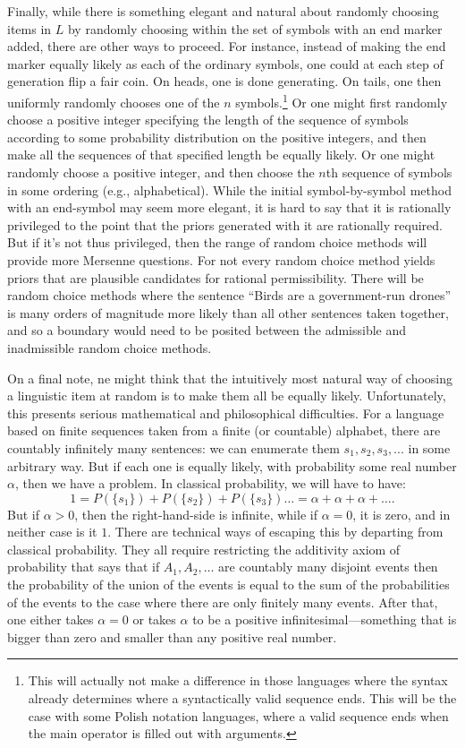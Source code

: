 Finally, while there is something elegant and natural about randomly choosing items in $L$ by randomly choosing within the
set of symbols with an end marker added, there are other ways to proceed. For instance, instead of making the end marker
equally likely as each of the ordinary symbols, one could at each step of generation flip a fair coin. On heads, one is done
generating. On tails, one then uniformly randomly chooses one of the $n$ symbols.\footnote{This will actually not make a 
difference in those languages where the syntax already determines where a syntactically valid sequence ends. This will be the
case with some Polish notation languages, where a valid sequence ends when the main operator is filled out with arguments.}
Or one might first randomly choose a positive integer specifying the length of the sequence of symbols according to some
probability distribution on the positive integers, and then make all the sequences of that specified length be equally likely. 
Or one might randomly choose a positive integer, and then choose the $n$th sequence of symbols in some ordering (e.g., alphabetical).
While the initial symbol-by-symbol method with an end-symbol may seem more elegant, it is hard to say that it is rationally
privileged to the point that the priors generated with it are rationally required. But if it's not thus privileged, then the
range of random choice methods will provide more Mersenne questions. For not every random choice method yields priors that
are plausible candidates for rational permissibility. There will be random choice methods where the sentence ``Birds are a government-run 
drones'' is many orders of magnitude more likely than all other sentences taken together, and so a boundary would need to be
posited between the admissible and inadmissible random choice methods.

On a final note, ne might think that the intuitively most natural way of choosing a linguistic item at random is to make them
all be equally likely. Unfortunately, this presents serious mathematical and philosophical difficulties. For a language
based on finite sequences taken from a finite (or countable) alphabet, there are countably infinitely many sentences:
we can enumerate them $s_1,s_2,s_3,...$ in some arbitrary way. But if each one is equally likely, with probability some
real number $\alpha$, then we have a problem. In classical probability, we will have to have:
$$
    1=P(\{s_1\})+P(\{s_2\})+P(\{s_3\})\dots = \alpha+\alpha+\alpha+\dots.
$$
But if $\alpha>0$, then the right-hand-side is infinite, while if $\alpha=0$, it is zero, and in neither case is it $1$.
There are technical ways of escaping this by departing from classical probability. They all require restricting the 
additivity axiom of probability that says that if $A_1,A_2,\dots$ are countably many disjoint events then the probability 
of the union of the events is equal to the sum of the probabilities of the events to the case where there are only finitely
many events. After that, one either takes $\alpha=0$ or takes $\alpha$ to be a positive infinitesimal---something that is bigger 
than zero and smaller than any positive real number. 

